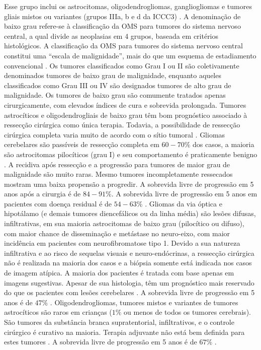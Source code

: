\documentclass[11pt,a4paper,oldfontcommands]{memoir}
\begin{document}
Esse grupo inclui os astrocitomas, oligodendrogliomas, gangliogliomas e tumores gliais mistos ou variantes (grupos IIIa, b e d da ICCC3) \cite{CNCR20910}. A denominação de baixo grau refere-se à classificação da OMS para tumores do sistema nervoso central, a qual divide as neoplasias em 4 grupos, baseada em critérios histológicos. A classificação da OMS para tumores do sistema nervoso central constitui uma “escala de malignidade”, mais do que um esquema de estadiamento convencional \cite{louis}. Os tumores classificados como Grau I ou II são coletivamente denominados tumores de baixo grau de malignidade, enquanto aqueles classificados como Grau III ou IV são designados tumores de alto grau de malignidade. Os tumores de baixo grau são comumente tratados apenas cirurgicamente, com elevados índices de cura e sobrevida prolongada. Tumores astrocíticos e oligodendrogliais de baixo grau têm bom prognóstico associado à ressecção cirúrgica como única terapia. Todavia, a possibilidade de ressecção cirúrgica completa varia muito de acordo com o sítio tumoral \cite{wisof}.
Gliomas cerebelares são passíveis de ressecção completa em \(60-70\%\) dos casos, a maioria são astrocitomas pilocíticos (grau I) e seu comportamento é praticamente benigno \cite{gan}. A recidiva após ressecção e a progressão para tumores de maior grau de malignidade são muito raras. Mesmo tumores incompletamente ressecados mostram uma baixa propensão a progredir. A sobrevida livre de progressão em 5 anos após a cirurgia é de \(84-91\%\). A sobrevida livre de progressão em 5 anos em pacientes com doença residual é de \(54-63\%\) \cite{wisof}. Gliomas da via óptica e hipotálamo (e demais tumores diencefálicos ou da linha média) são lesões difusas, infiltrativas, em sua maioria astrocitomas de baixo grau (pilocítico ou difuso), com maior chance de disseminação e metástase no neuro-eixo, com maior incidência em pacientes com neurofibromatose tipo 1. Devido a sua natureza infiltrativa e ao risco de sequelas visuais e neuro-endócrinas, a ressecção cirúrgica não é realizada na maioria dos casos e a biópsia somente está indicada nos casos de imagem atípica. A maioria dos pacientes é tratada com base apenas em imagens sugestivas. Apesar de sua histologia, têm um prognóstico mais reservado do que os pacientes com lesões cerebelares \cite{gan}. A sobrevida livre de progressão em 5 anos é de \(47\%\) \cite{wisof}. Oligodendrogliomas, tumores mistos e variantes de tumores astrocíticos são raros em crianças (\(1\%\) ou menos de todos os tumores cerebrais). São tumores da substância branca supratentorial, infiltrativos, e o controle cirúrgico é curativo na maioria. Terapia adjuvante não está bem definida para estes tumores \cite{gan}. A sobrevida livre de progressão em 5 anos é de \(67\%\) \cite{wisof}.
\end{document}
